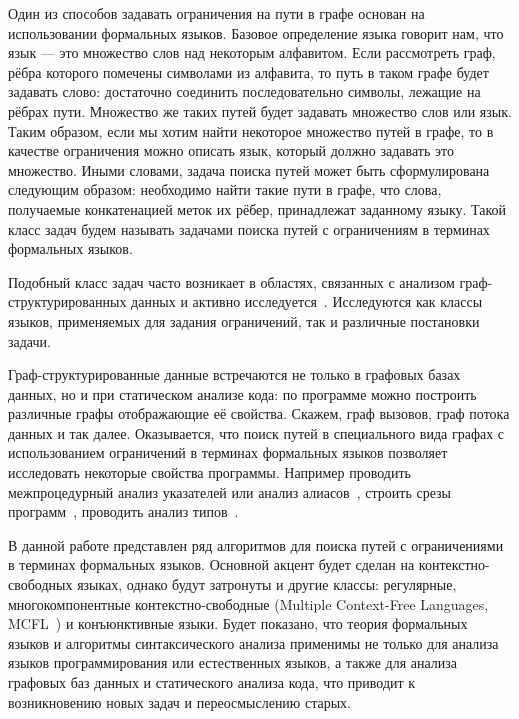 Один из способов задавать ограничения на пути в графе основан на использовании формальных языков.
Базовое определение языка говорит нам, что язык --- это множество слов над некоторым алфавитом.
Если рассмотреть граф, рёбра которого помечены символами из алфавита, то путь в таком графе будет задавать слово: достаточно соединить последовательно символы, лежащие на рёбрах пути.
Множество же таких путей будет задавать множество слов или язык.
Таким образом, если мы хотим найти некоторое множество путей в графе, то в качестве ограничения можно описать язык, который должно задавать это множество.
Иными словами, задача поиска путей может быть сформулирована следующим образом: необходимо найти такие пути в графе, что слова, получаемые конкатенацией меток их рёбер, принадлежат заданному языку.
Такой класс задач будем называть задачами поиска путей с ограничениям в терминах формальных языков.

Подобный класс задач часто возникает в областях, связанных с анализом граф-структурированных данных и активно исследуется~\cite{doi:10.1137/S0097539798337716,axelsson2011formal,10.1007/978-3-642-22321-1_24,Ward:2010:CRL:1710158.1710234,barrett2007label,doi:10.1137/S0097539798337716}.
Исследуются как классы языков, применяемых для задания ограничений, так и различные постановки задачи.

Граф-структурированные данные встречаются не только в графовых базах данных, но и при статическом анализе кода: по программе можно построить различные графы отображающие её свойства.
Скажем, граф вызовов, граф потока данных и так далее.
Оказывается, что поиск путей в специального вида графах с использованием ограничений в терминах формальных языков позволяет исследовать некоторые свойства программы.
Например проводить межпроцедурный анализ указателей или анализ алиасов~\cite{Zheng,10.1145/2001420.2001440,10.1145/2714064.2660213}, строить срезы программ~\cite{10.1145/193173.195287}, проводить анализ типов~\cite{10.1145/373243.360208}.

В данной работе представлен ряд алгоритмов для поиска путей с ограничениями в терминах формальных языков.
Основной акцент будет сделан на контекстно-свободных языках, однако будут затронуты и другие классы: регулярные, многокомпонентные контекстно-свободные (Multiple Context-Free Languages, MCFL~\cite{SEKI1991191}) и конъюнктивные языки.
Будет показано, что теория формальных языков и алгоритмы синтаксического анализа применимы не только для анализа языков программирования или естественных языков, а также для анализа графовых баз данных и статического анализа кода, что приводит к возникновению новых задач и переосмыслению старых.


